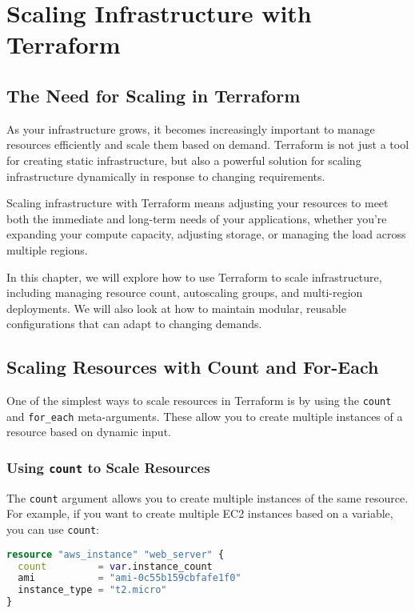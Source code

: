 \chapter{Scaling Infrastructure with Terraform}
\sloppy

\section{The Need for Scaling in Terraform}

As your infrastructure grows, it becomes increasingly important to manage resources efficiently and scale them based on demand. Terraform is not just a tool for creating static infrastructure, but also a powerful solution for scaling infrastructure dynamically in response to changing requirements.

Scaling infrastructure with Terraform means adjusting your resources to meet both the immediate and long-term needs of your applications, whether you're expanding your compute capacity, adjusting storage, or managing the load across multiple regions.

In this chapter, we will explore how to use Terraform to scale infrastructure, including managing resource count, autoscaling groups, and multi-region deployments. We will also look at how to maintain modular, reusable configurations that can adapt to changing demands.

\section{Scaling Resources with Count and For-Each}

One of the simplest ways to scale resources in Terraform is by using the \texttt{count} and \texttt{for\_each} meta-arguments. These allow you to create multiple instances of a resource based on dynamic input.

\subsection{Using \texttt{count} to Scale Resources}

The \texttt{count} argument allows you to create multiple instances of the same resource. For example, if you want to create multiple EC2 instances based on a variable, you can use \texttt{count}:

\begin{lstlisting}[language=terraform]
resource "aws_instance" "web_server" {
  count         = var.instance_count
  ami           = "ami-0c55b159cbfafe1f0"
  instance_type = "t2.micro"
}
\end{lstlisting}

